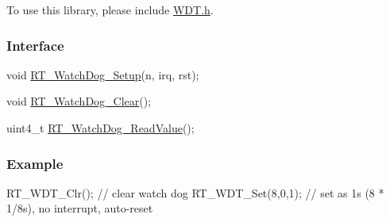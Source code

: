 To use this library, please include {\ttfamily \mbox{\hyperlink{a00179}{W\+D\+T.\+h}}}.

\subsubsection*{Interface}


\begin{DoxyCode}
\textcolor{keywordtype}{void} \mbox{\hyperlink{a00179_a369b51538a0ccf57dcdb30e12352a8c7}{RT\_WatchDog\_Setup}}(n, irq, rst);

\textcolor{keywordtype}{void} \mbox{\hyperlink{a00179_ae976b2fe76d4b216e68a771068434abc}{RT\_WatchDog\_Clear}}();

uint4\_t \mbox{\hyperlink{a00179_acdfc8b8f0bddfd7382d49a22a92a5930}{RT\_WatchDog\_ReadValue}}();
\end{DoxyCode}


\subsubsection*{Example}


\begin{DoxyCode}
RT\_WDT\_Clr();       \textcolor{comment}{// clear watch dog}
RT\_WDT\_Set(8,0,1);  \textcolor{comment}{// set as 1s (8 * 1/8s), no interrupt, auto-reset}
\end{DoxyCode}
 